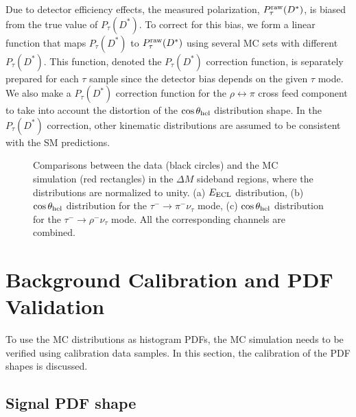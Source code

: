 \documentclass[aps,prd,twocolumn,superscriptaddress,showpacs,preprintnumbers,amsmath,amssymb]{revtex4-1}
\begin{document}
Due to detector efficiency effects, the measured polarization, $P_\tau^{\rm raw}(D^*)$, is biased from the true value of $P_\tau(D^*)$. To correct for this bias, we form a linear function that maps $P_\tau(D^*)$ to $P_\tau^{\rm raw}(D^*)$ using several MC sets with different $P_\tau(D^*)$. This function, denoted the $P_\tau(D^*)$ correction function, is separately prepared for each $\tau$ sample since the detector bias depends on the given $\tau$ mode. We also make a $P_\tau(D^*)$ correction function for the $\rho \leftrightarrow \pi$ cross feed component  to take into account the distortion of the $\cos\theta_{\rm hel}$ distribution shape. In the $P_\tau(D^*)$ correction, other kinematic distributions are assumed to be consistent with the SM predictions.

\begin{figure*}[t!]
  \centering
  \caption{Comparisons between the data (black circles) and the MC simulation (red rectangles) in the $\Delta M$ sideband regions, where the distributions are normalized to unity. (a) $E_{\rm ECL}$ distribution, (b) $\cos\theta_{\rm hel}$ distribution for the $\tau^- \rightarrow \pi^- \nu_\tau$ mode, (c) $\cos\theta_{\rm hel}$ distribution for the $\tau^- \rightarrow \rho^- \nu_\tau$ mode. All the corresponding channels are combined.}
  \label{fig:FakeDst-comp}
  \vspace{5mm}
\end{figure*}



\section{Background Calibration and PDF Validation}

To use the MC distributions as histogram PDFs, the MC simulation needs to be verified using calibration data samples. In this section, the calibration of the PDF shapes is discussed.

\subsection{Signal PDF shape}
\end{document}
